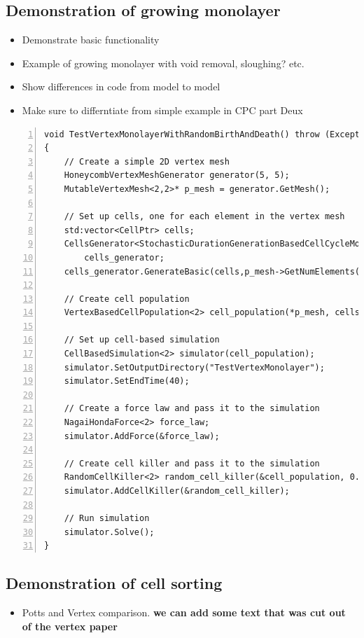 \documentclass{siamltex}
\newcommand{\highlight}[1]{{\color{red} \bf{#1}}}
\begin{document}
\subsection{Demonstration of growing monolayer} \label{sec:growing_domain}
\begin{itemize}
  \item Demonstrate basic functionality
  \item Example of growing monolayer with void removal, sloughing? etc. 
  \item Show differences in code from model to model
  \item Make sure to differntiate from simple example in CPC part Deux
\end{itemize}
\begin{small}
\begin{Verbatim}[frame=single, numbers=left, numbersep=2pt]
void TestVertexMonolayerWithRandomBirthAndDeath() throw (Exception)
{
    // Create a simple 2D vertex mesh
    HoneycombVertexMeshGenerator generator(5, 5);
    MutableVertexMesh<2,2>* p_mesh = generator.GetMesh();

    // Set up cells, one for each element in the vertex mesh
    std:vector<CellPtr> cells;
    CellsGenerator<StochasticDurationGenerationBasedCellCycleModel, 2>
        cells_generator;
    cells_generator.GenerateBasic(cells,p_mesh->GetNumElements());

    // Create cell population
    VertexBasedCellPopulation<2> cell_population(*p_mesh, cells);

    // Set up cell-based simulation
    CellBasedSimulation<2> simulator(cell_population);
    simulator.SetOutputDirectory("TestVertexMonolayer");
    simulator.SetEndTime(40);

    // Create a force law and pass it to the simulation
    NagaiHondaForce<2> force_law;
    simulator.AddForce(&force_law);

    // Create cell killer and pass it to the simulation
    RandomCellKiller<2> random_cell_killer(&cell_population, 0.01);
    simulator.AddCellKiller(&random_cell_killer);

    // Run simulation
    simulator.Solve();
}
\end{Verbatim}
\end{small}

\subsection{Demonstration of cell sorting} \label{sec:cell_sorting}
\begin{itemize}
 \item Potts and Vertex comparison. \highlight{we can add some text that was cut out of the vertex paper}
\end{itemize}
\end{document}
